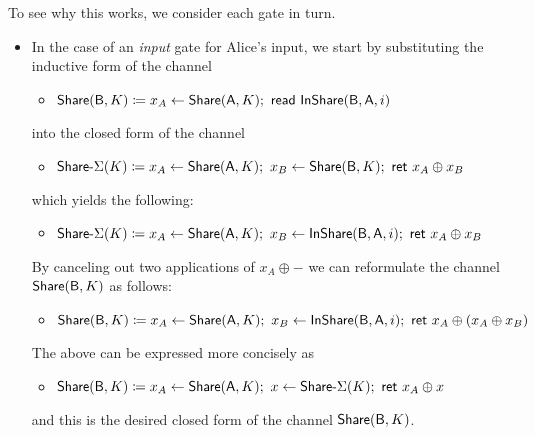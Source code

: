 \noindent To see why this works, we consider each gate in turn.
\begin{itemize}
\item In the case of an \emph{input} gate for Alice's input, we start by substituting the inductive form of the channel
\begin{itemize}
\item $\mathsf{Share}(\mathsf{B},K) \coloneqq x_A \leftarrow \mathsf{Share}(\mathsf{A},K); \ \mathsf{read} \ \mathsf{InShare}(\mathsf{B},\mathsf{A},i)$
\end{itemize}
into the closed form of the channel
\begin{itemize}
\item $\mathsf{Share}\textsf{-}\Sigma(K) \coloneqq x_A \leftarrow \mathsf{Share}(\mathsf{A},K); \ x_B \leftarrow \mathsf{Share}(\mathsf{B},K); \ \mathsf{ret} \ x_A \oplus x_B$
\end{itemize}
which yields the following:
\begin{itemize}
\item $\mathsf{Share}\textsf{-}\Sigma(K) \coloneqq x_A \leftarrow \mathsf{Share}(\mathsf{A},K); \ x_B \leftarrow \mathsf{InShare}(\mathsf{B},\mathsf{A},i); \ \mathsf{ret} \ x_A \oplus x_B$
\end{itemize}
By canceling out two applications of $x_A \oplus -$ we can reformulate the channel $\mathsf{Share}(\mathsf{B},K)$ as follows:
\begin{itemize}
\item $\mathsf{Share}(\mathsf{B},K) \coloneqq x_A \leftarrow \mathsf{Share}(\mathsf{A},K); \ x_B \leftarrow \mathsf{InShare}(\mathsf{B},\mathsf{A},i); \ \mathsf{ret} \ x_A \oplus (x_A \oplus x_B)$
\end{itemize}
The above can be expressed more concisely as
\begin{itemize}
\item $\mathsf{Share}(\mathsf{B},K) \coloneqq x_A \leftarrow \mathsf{Share}(\mathsf{A},K); \ x \leftarrow \mathsf{Share}\textsf{-}\Sigma(K); \ \mathsf{ret} \ x_A \oplus x$
\end{itemize}
and this is the desired closed form of the channel $\mathsf{Share}(\mathsf{B},K)$.


\end{itemize}
